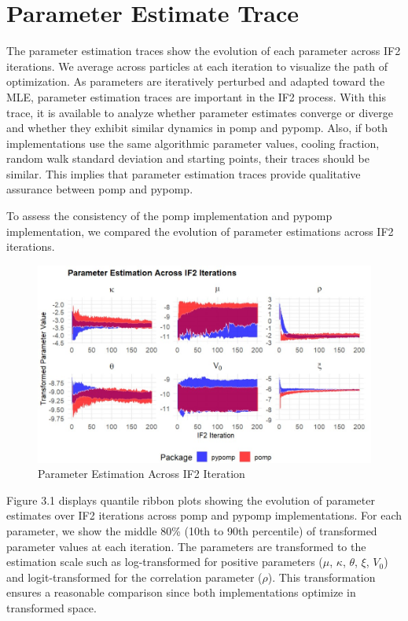 \documentclass[11pt]{report}
\begin{document}
\section{Parameter Estimate Trace}\label{sec:param_est}
The parameter estimation traces show the evolution of each parameter across IF2 iterations. We average across particles at each iteration to visualize the path of optimization. As parameters are iteratively perturbed and adapted toward the MLE, parameter estimation traces are important in the IF2 process. With this trace, it is available to analyze whether parameter estimates converge or diverge and whether they exhibit similar dynamics in pomp and pypomp. Also, if both implementations use the same algorithmic parameter values, cooling fraction, random walk standard deviation and starting points, their traces should be similar. This implies that parameter estimation traces provide qualitative assurance between pomp and pypomp.


To assess the consistency of the pomp implementation and pypomp implementation, we compared the evolution of parameter estimations across IF2 iterations. 


\begin{figure}[ht]
\begin{center}
\includegraphics[width=\textwidth]{param_trace.jpg}
\end{center}
\caption{Parameter Estimation Across IF2 Iteration}
\label{fig:if2paramtrace}
\end{figure}


Figure {3.1} displays quantile ribbon plots showing the evolution of parameter estimates over IF2 iterations across pomp and pypomp implementations. For each parameter, we show the middle 80\% (10th to 90th percentile) of transformed parameter values at each iteration.
The parameters are transformed to the estimation scale such as log-transformed for positive parameters ($\mu$, $\kappa$, $\theta$, $\xi$, $V_0$) and logit-transformed for the correlation parameter ($\rho$). This transformation ensures a reasonable comparison since both implementations optimize in transformed space. 
\end{document}
